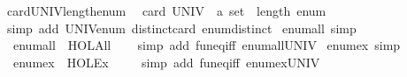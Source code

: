 \begin{isabellebody}
\isamarkupfalse%
%
\endisatagproof
{\isafoldproof}%
%
\isadelimproof
\isanewline
%
\endisadelimproof
\isanewline
{}\isamarkupfalse%
\ card{\isacharunderscore}{\kern0pt}UNIV{\isacharunderscore}{\kern0pt}length{\isacharunderscore}{\kern0pt}enum{\isacharcolon}{\kern0pt}\isanewline
\ \ {\isachardoublequoteopen}card\ {\isacharparenleft}{\kern0pt}UNIV\ {\isacharcolon}{\kern0pt}{\isacharcolon}{\kern0pt}\ {\isacharprime}{\kern0pt}a\ set{\isacharparenright}{\kern0pt}\ {\isacharequal}{\kern0pt}\ length\ enum{\isachardoublequoteclose}\isanewline
%
\isadelimproof
\ \ %
\endisadelimproof
%
\isatagproof
{}\isamarkupfalse%
\ {\isacharparenleft}{\kern0pt}simp\ add{\isacharcolon}{\kern0pt}\ UNIV{\isacharunderscore}{\kern0pt}enum\ distinct{\isacharunderscore}{\kern0pt}card\ enum{\isacharunderscore}{\kern0pt}distinct{\isacharparenright}{\kern0pt}%
\endisatagproof
{\isafoldproof}%
%
\isadelimproof
\isanewline
%
\endisadelimproof
\isanewline
{}\isamarkupfalse%
\ enum{\isacharunderscore}{\kern0pt}all\ {\isacharbrackleft}{\kern0pt}simp{\isacharbrackright}{\kern0pt}{\isacharcolon}{\kern0pt}\isanewline
\ \ {\isachardoublequoteopen}enum{\isacharunderscore}{\kern0pt}all\ {\isacharequal}{\kern0pt}\ HOL{\isachardot}{\kern0pt}All{\isachardoublequoteclose}\isanewline
%
\isadelimproof
\ \ %
\endisadelimproof
%
\isatagproof
{}\isamarkupfalse%
\ {\isacharparenleft}{\kern0pt}simp\ add{\isacharcolon}{\kern0pt}\ fun{\isacharunderscore}{\kern0pt}eq{\isacharunderscore}{\kern0pt}iff\ enum{\isacharunderscore}{\kern0pt}all{\isacharunderscore}{\kern0pt}UNIV{\isacharparenright}{\kern0pt}%
\endisatagproof
{\isafoldproof}%
%
\isadelimproof
\isanewline
%
\endisadelimproof
\isanewline
{}\isamarkupfalse%
\ enum{\isacharunderscore}{\kern0pt}ex\ {\isacharbrackleft}{\kern0pt}simp{\isacharbrackright}{\kern0pt}{\isacharcolon}{\kern0pt}\isanewline
\ \ {\isachardoublequoteopen}enum{\isacharunderscore}{\kern0pt}ex\ {\isacharequal}{\kern0pt}\ HOL{\isachardot}{\kern0pt}Ex{\isachardoublequoteclose}\ \isanewline
%
\isadelimproof
\ \ %
\endisadelimproof
%
\isatagproof
{}\isamarkupfalse%
\ {\isacharparenleft}{\kern0pt}simp\ add{\isacharcolon}{\kern0pt}\ fun{\isacharunderscore}{\kern0pt}eq{\isacharunderscore}{\kern0pt}iff\ enum{\isacharunderscore}{\kern0pt}ex{\isacharunderscore}{\kern0pt}UNIV{\isacharparenright}{\kern0pt}%
\endisatagproof
{\isafoldproof}%
%
\isadelimproof
\isanewline
%
\endisadelimproof
\isanewline
{}\isamarkupfalse%
%
\isadelimdocument
%
\endisadelimdocument
%
\isatagdocument
%
\end{isabellebody}
